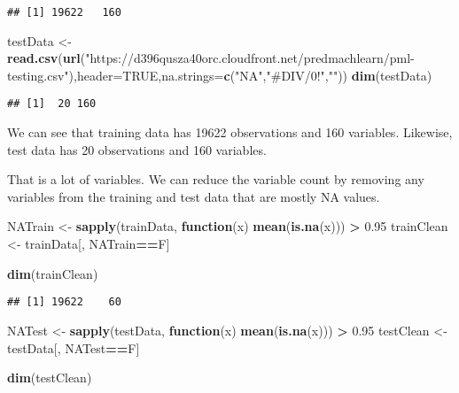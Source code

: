 \documentclass[]{article}
\newenvironment{Shaded}{\begin{snugshade}}{\end{snugshade}}
\newcommand{\ControlFlowTok}[1]{\textcolor[rgb]{0.13,0.29,0.53}{\textbf{#1}}}
\newcommand{\DataTypeTok}[1]{\textcolor[rgb]{0.13,0.29,0.53}{#1}}
\newcommand{\FloatTok}[1]{\textcolor[rgb]{0.00,0.00,0.81}{#1}}
\newcommand{\KeywordTok}[1]{\textcolor[rgb]{0.13,0.29,0.53}{\textbf{#1}}}
\newcommand{\NormalTok}[1]{#1}
\newcommand{\OperatorTok}[1]{\textcolor[rgb]{0.81,0.36,0.00}{\textbf{#1}}}
\newcommand{\OtherTok}[1]{\textcolor[rgb]{0.56,0.35,0.01}{#1}}
\newcommand{\StringTok}[1]{\textcolor[rgb]{0.31,0.60,0.02}{#1}}
\begin{document}
\begin{verbatim}
## [1] 19622   160
\end{verbatim}

\begin{Shaded}
\begin{Highlighting}[]
\NormalTok{testData <-}\StringTok{ }\KeywordTok{read.csv}\NormalTok{(}\KeywordTok{url}\NormalTok{(}\StringTok{"https://d396qusza40orc.cloudfront.net/predmachlearn/pml-testing.csv"}\NormalTok{),}\DataTypeTok{header=}\OtherTok{TRUE}\NormalTok{,}\DataTypeTok{na.strings=}\KeywordTok{c}\NormalTok{(}\StringTok{"NA"}\NormalTok{,}\StringTok{"#DIV/0!"}\NormalTok{,}\StringTok{""}\NormalTok{))}
\KeywordTok{dim}\NormalTok{(testData)}
\end{Highlighting}
\end{Shaded}

\begin{verbatim}
## [1]  20 160
\end{verbatim}

We can see that training data has 19622 observations and 160 variables.
Likewise, test data has 20 observations and 160 variables.

That is a lot of variables. We can reduce the variable count by removing
any variables from the training and test data that are mostly NA values.

\begin{Shaded}
\begin{Highlighting}[]
\NormalTok{NATrain <-}\StringTok{ }\KeywordTok{sapply}\NormalTok{(trainData, }\ControlFlowTok{function}\NormalTok{(x) }\KeywordTok{mean}\NormalTok{(}\KeywordTok{is.na}\NormalTok{(x))) }\OperatorTok{>}\StringTok{ }\FloatTok{0.95}
\NormalTok{trainClean <-}\StringTok{ }\NormalTok{trainData[, NATrain}\OperatorTok{==}\NormalTok{F]}

\KeywordTok{dim}\NormalTok{(trainClean)}
\end{Highlighting}
\end{Shaded}

\begin{verbatim}
## [1] 19622    60
\end{verbatim}

\begin{Shaded}
\begin{Highlighting}[]
\NormalTok{NATest <-}\StringTok{ }\KeywordTok{sapply}\NormalTok{(testData, }\ControlFlowTok{function}\NormalTok{(x) }\KeywordTok{mean}\NormalTok{(}\KeywordTok{is.na}\NormalTok{(x))) }\OperatorTok{>}\StringTok{ }\FloatTok{0.95}
\NormalTok{testClean <-}\StringTok{ }\NormalTok{testData[, NATest}\OperatorTok{==}\NormalTok{F]}

\KeywordTok{dim}\NormalTok{(testClean)}
\end{Highlighting}
\end{Shaded}
\end{document}
